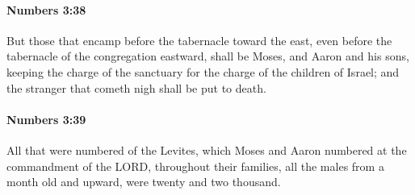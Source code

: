 		\paragraph{Numbers 3:38} %
			\label{NUMBERS-3-38}

			But those that encamp before the tabernacle toward the east, even before the tabernacle of the congregation eastward, shall be Moses, and Aaron and his sons, keeping the charge of the sanctuary for the charge of the children of Israel; and the stranger that cometh nigh shall be put to death.


		\paragraph{Numbers 3:39} %
			\label{NUMBERS-3-39}

			All that were numbered of the Levites, which Moses and Aaron numbered at the commandment of the LORD, throughout their families, all the males from a month old and upward, were twenty and two thousand.

